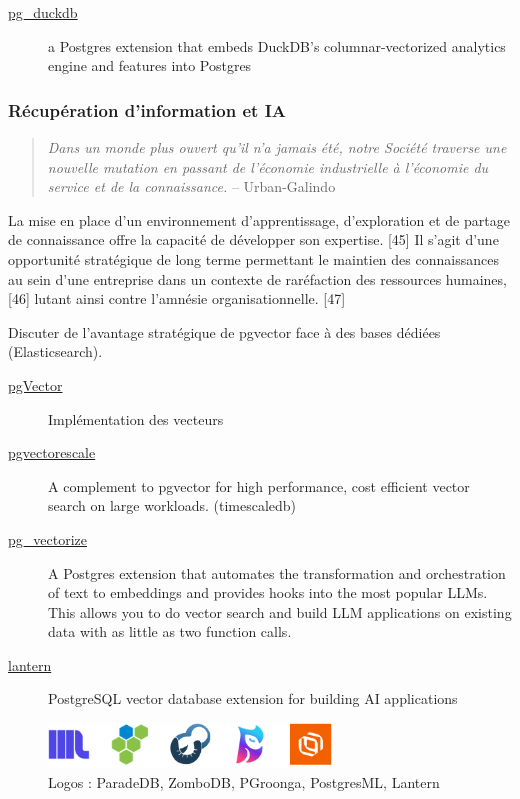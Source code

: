 \documentclass[a4paper,12pt]{article}
\begin{document}
\begin{multicols*}{2}
\begin{description}
\item[{\href{https://github.com/duckdb/pg\_duckdb}{pg\_duckdb}}] a Postgres extension that embeds DuckDB's columnar-vectorized analytics engine and features into Postgres
\end{description}
\subsubsection*{Récupération d'information et IA}
\label{sec:org6eb7140}
\begin{quote}
\emph{Dans un monde plus ouvert qu’il n’a jamais été, notre Société traverse une nouvelle mutation en passant de l’économie industrielle à l’économie du service et de la connaissance.} -- Urban-Galindo\autocite{jean-jacquesurban-galindoGestionConfigurationIngenierie2008}
\end{quote}

La mise en place d’un environnement d’apprentissage, d’exploration et de partage de connaissance offre la capacité de développer son expertise. [45] Il s’agit d’une opportunité stratégique de long terme permettant le maintien des connaissances au sein d’une entreprise dans un contexte de raréfaction des ressources humaines, [46] lutant ainsi contre l’amnésie organisationnelle. [47] 

Discuter de l’avantage stratégique de pgvector face à des bases dédiées (Elasticsearch).

\begin{description}
\item[{\href{https://github.com/pgvector/pgvector}{pgVector}}] Implémentation des vecteurs
\item[{\href{https://github.com/timescale/pgvectorscale}{pgvectorescale}}] A complement to pgvector for high performance, cost efficient vector search on large workloads. (timescaledb)
\item[{\href{https://github.com/tembo-io/pg\_vectorize}{pg\_vectorize}}] A Postgres extension that automates the transformation and orchestration of text to embeddings and provides hooks into the most popular LLMs. This allows you to do vector search and build LLM applications on existing data with as little as two function calls.
\item[{\href{https://github.com/lanterndata/lantern}{lantern}}] PostgreSQL vector database extension for building AI applications
\end{description}

\begin{figure}[H]
\centering
\includegraphics[height=1.2cm]{icons/pg-search.pdf}
\caption{\label{fig:org31154c2}Logos : ParadeDB, ZomboDB, PGroonga, PostgresML, Lantern}
\end{figure}



\end{multicols*}
\end{document}
